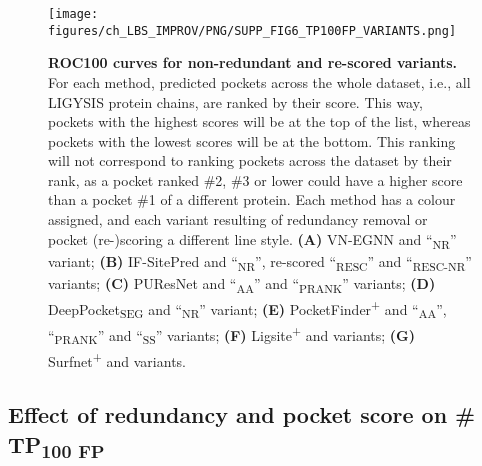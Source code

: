 \begin{figure}[ht!]
    \centering
    \texttt{[image: figures/ch\_LBS\_IMPROV/PNG/SUPP\_FIG6\_TP100FP\_VARIANTS.png]}
    \caption[ROC100 curves for non-redundant and re-scored variants]{\textbf{ROC100 curves for non-redundant and re-scored variants.} For each method, predicted pockets across the whole dataset, i.e., all LIGYSIS protein chains, are ranked by their score. This way, pockets with the highest scores will be at the top of the list, whereas pockets with the lowest scores will be at the bottom. This ranking will not correspond to ranking pockets across the dataset by their rank, as a pocket ranked \#2, \#3 or lower could have a higher score than a pocket \#1 of a different protein. Each method has a colour assigned, and each variant resulting of redundancy removal or pocket (re-)scoring a different line style. \textbf{(A)} VN-EGNN and ``\textsubscript{NR}'' variant; \textbf{(B)} IF-SitePred and ``\textsubscript{NR}'', re-scored ``\textsubscript{RESC}'' and ``\textsubscript{RESC-NR}'' variants; \textbf{(C)} PUResNet and ``\textsubscript{AA}'' and ``\textsubscript{PRANK}'' variants; \textbf{(D)} DeepPocket\textsubscript{SEG} and ``\textsubscript{NR}'' variant; \textbf{(E)} PocketFinder\textsuperscript{+} and ``\textsubscript{AA}'', ``\textsubscript{PRANK}'' and ``\textsubscript{SS}'' variants; \textbf{(F)} Ligsite\textsuperscript{+} and variants; \textbf{(G)} Surfnet\textsuperscript{+} and variants.}
    \label{fig:pocket_ROC100_variants}
\end{figure}

\FloatBarrier

\subsection{Effect of redundancy and pocket score on \# TP\textsubscript{100 FP}}

